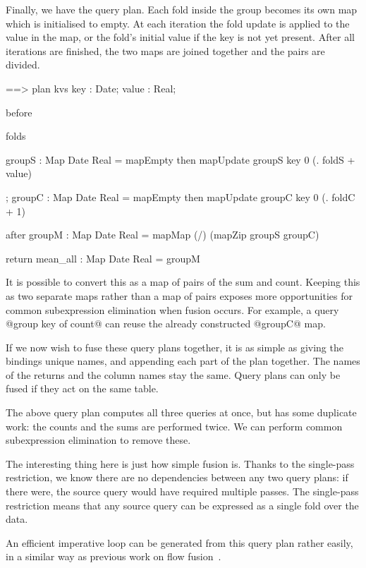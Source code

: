 Finally, we have the query plan.
Each fold inside the group becomes its own map which is initialised to empty.
At each iteration the fold update is applied to the value in the map, or the fold's initial value if the key is not yet present.
After all iterations are finished, the two maps are joined together and the pairs are divided.
\begin{code}
==> plan kvs { key : Date; value : Real; }

    before { }

    folds  { groupS   : Map Date Real
                = mapEmpty
             then mapUpdate groupS key 0
                  (\foldS. foldS + value)

           ; groupC   : Map Date Real
                = mapEmpty
             then mapUpdate groupC key 0
                  (\foldC. foldC + 1) }

    after  { groupM   : Map Date Real
                = mapMap (/) (mapZip groupS groupC) }

    return { mean_all : Map Date Real = groupM }
\end{code}

It is possible to convert this as a map of pairs of the sum and count.
Keeping this as two separate maps rather than a map of pairs exposes more opportunities for common subexpression elimination when fusion occurs.
For example, a query @group key of count@ can reuse the already constructed @groupC@ map.


If we now wish to fuse these query plans together, it is as simple as giving the bindings unique names, and appending each part of the plan together.
The names of the returns and the column names stay the same.
Query plans can only be fused if they act on the same table.

The above query plan computes all three queries at once, but has some duplicate work: the counts and the sums are performed twice.
We can perform common subexpression elimination to remove these.

The interesting thing here is just how simple fusion is.
Thanks to the single-pass restriction, we know there are no dependencies between any two query plans: if there were, the source query would have required multiple passes.
The single-pass restriction means that any source query can be expressed as a single fold over the data.

An efficient imperative loop can be generated from this query plan rather easily, in a similar way as previous work on flow fusion~\cite{lippmeier2013data}.

